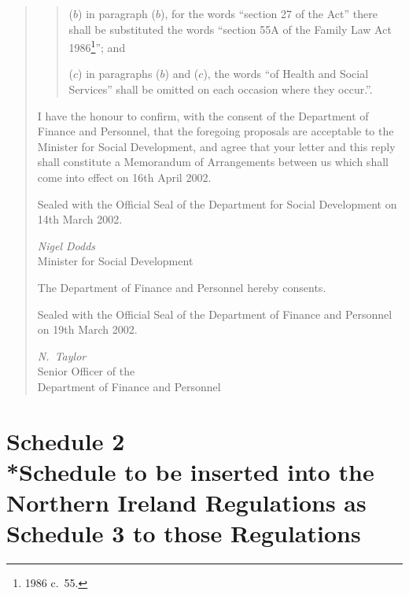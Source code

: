 \documentclass[12pt,a4paper]{article}
\begin{document}
\begin{quotation}
\begin{quotation}
\begin{enumerate}
($b$) in paragraph ($b$), for the words “section 27 of the Act” there shall be substituted the words “section 55A of the Family Law Act 1986\footnote{1986 c.\ 55.}”; and

($c$) in paragraphs ($b$)  and ($c$), the words “of Health and Social Services” shall be omitted on each occasion where they occur.”.
\end{enumerate}
\end{quotation}

I have the honour to confirm, with the consent of the Department of Finance and Personnel, that the foregoing proposals are acceptable to the Minister for Social Development, and agree that your letter and this reply shall constitute a Memorandum of Arrangements between us which shall come into effect on 16th April 2002.

\bigskip

Sealed with the Official Seal of the Department for Social Development on 14th March 2002.

{\raggedleft
\emph{Nigel Dodds}\\
Minister for Social Development

}

\bigskip

The Department of Finance and Personnel hereby consents.

Sealed with the Official Seal of the Department of Finance and Personnel on 19th March 2002.

{\raggedleft
\emph{N.~Taylor}\\
Senior Officer of the\\
Department of Finance and Personnel

}

\end{quotation}

\part[Schedule 2 --- Schedule to be inserted into the Northern Ireland Regulations as Schedule 3 to those Regulations]{Schedule 2\\*Schedule to be inserted into the Northern Ireland Regulations as Schedule 3 to those Regulations}
\end{document}
